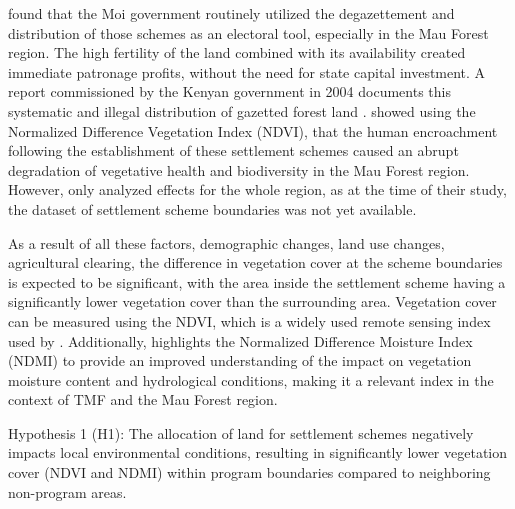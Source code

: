 \cite{sanfordDemocratizationElectionsPublic2023} found that the Moi government routinely utilized the degazettement and distribution of those schemes as an electoral tool, especially in the Mau Forest region.
The high fertility of the land combined with its availability created immediate patronage profits, without the need for state capital investment.
A report commissioned by the Kenyan government in 2004 documents this systematic and illegal distribution of gazetted forest land \parencite{ndunguReportComissionInquiry2004,southallNdunguReportLand2005}.
\cite{kinyanjuiNDVIbasedVegetationMonitoring2011} showed using the Normalized Difference Vegetation Index (NDVI), that the human encroachment
following the establishment of these settlement schemes caused an abrupt degradation of vegetative health and biodiversity in the Mau Forest region.
However, \cite{kinyanjuiNDVIbasedVegetationMonitoring2011} only analyzed effects for the whole region, as at the time of their study, the dataset of settlement scheme boundaries was not yet available.

As a result of all these factors, demographic changes, land use changes, agricultural clearing, the difference in vegetation cover at the scheme boundaries is expected to be significant,
with the area inside the settlement scheme having a significantly lower vegetation cover than the surrounding area.
Vegetation cover can be measured using the NDVI, which is a widely used remote sensing index used by \cite{khanAssessingImpactLand2025, serneelsProximateCausesLanduse2001,kinyanjuiNDVIbasedVegetationMonitoring2011,lambinMonitoringForestDegradation1999,pettorelliUsingSatellitederivedNDVI2005}.
Additionally, \cite{khanAssessingImpactLand2025} highlights the Normalized Difference Moisture Index (NDMI) to provide an improved understanding of the impact on vegetation moisture content and hydrological conditions,
making it a relevant index in the context of TMF and the Mau Forest region.

Hypothesis 1 (H1): The allocation of land for settlement schemes negatively impacts local environmental conditions, resulting in significantly lower vegetation cover (NDVI and NDMI) within program boundaries compared to neighboring non-program areas.